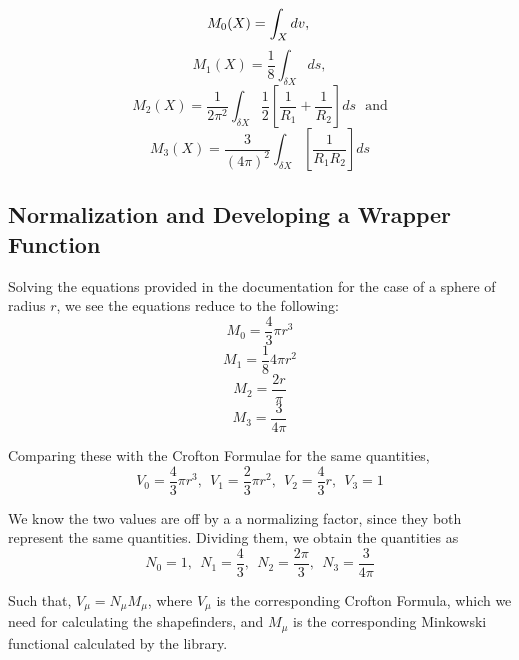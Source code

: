\documentclass{article}
\begin{document}
\begin{equation}
    M_0(X) = \int_X dv, \\
    \label{eq:M_0}
\end{equation}
\begin{equation}
    M_1(X) = \frac{1}{8} \int_{\delta X} ds,
    \label{eq:M_1}
\end{equation}
\begin{equation}
    M_2(X) = \frac{1}{2\pi^2} \int_{\delta X} \frac{1}{2} \left[ \frac{1}{R_1} + \frac{1}{R_2} \right] ds \:\:\: \text{and}
    \label{eq:M_2}
\end{equation}
\begin{equation}
    M_3(X) = \frac{3}{(4\pi)^2} \int_{\delta X} \left[ \frac{1}{R_1 R_2} \right] ds
    \label{eq:M_3}
\end{equation}

\subsection{Normalization and Developing a Wrapper Function}

Solving the equations provided in the documentation for the case of a sphere of radius $r$, we see the equations reduce to the following:
\begin{equation}
    M_0 = \frac 4 3 \pi r^3
\end{equation}
\begin{equation}
    M_1 = \frac 1 8 4 \pi r^2
\end{equation}
\begin{equation}
    M_2 = \frac {2 r}{\pi} 
\end{equation}
\begin{equation}
    M_3 = \frac {3}{4 \pi}
\end{equation}

Comparing these with the Crofton Formulae \cite{AmitSetaThesis} for the same quantities,
$$V_0 = \frac 4 3 \pi r^3, \:\: V_1 = \frac 2 3 \pi r^2, \:\: V_2 = \frac 4 3 r, \:\: V_3 = 1$$

We know the two values are off by a a normalizing factor, since they both represent the same quantities. Dividing them, we obtain the quantities as
\begin{equation}
    N_0 = 1, \: \: N_1 = \frac 4 3 ,\: \: N_2 = \frac {2 \pi}{3} ,\: \: N_3 = \frac{3}{4 \pi} 
\end{equation} 

Such that, $V_\mu = N_\mu M_\mu$, where $V_\mu$ is the corresponding Crofton Formula, which we need for calculating the shapefinders, and $M_\mu$ is the corresponding Minkowski functional calculated by the library.
\end{document}
